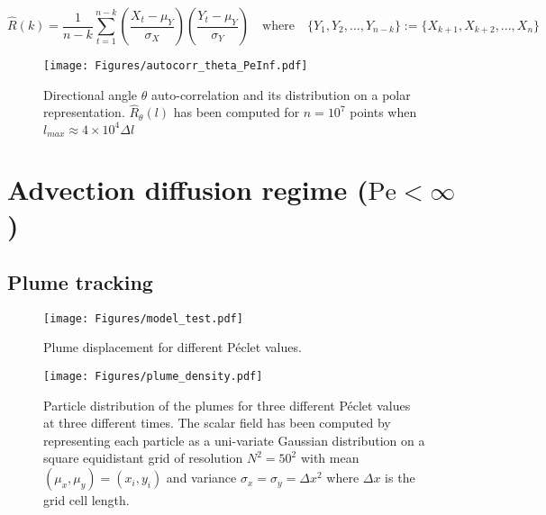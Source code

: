 \begin{equation}
\hat R(k) = \frac{1}{n-k} \sum_{t=1}^{n-k} \left(\frac{X_t-\mu_Y}{\sigma_X}\right)\left(\frac{Y_t-\mu_Y}{\sigma_Y}\right) \quad\textrm{where}\quad \{Y_1,Y_2,...,Y_{n-k}\} := \{X_{k+1},X_{k+2},...,X_{n}\} 
\label{eq:autocorr}
\end{equation}

\begin{figure}
	\centering
	\texttt{[image: Figures/autocorr\_theta\_PeInf.pdf]}
	\caption{Directional angle $\theta$ auto-correlation and its distribution on a polar representation. $\hat{R}_\theta(l)$ has been computed for $n=10^7$ points when $l_{max}\approx 4\times10^4 \Delta l$}
	\label{fig:autocorrt_peinf}
\end{figure}

\chapter{Advection diffusion regime ($\mathrm{Pe}<\infty$)}

\section{Plume tracking}
\begin{figure}[h!]
	\centering
	\texttt{[image: Figures/model\_test.pdf]}
	\caption{Plume displacement for different Péclet values.}
	\label{fig:lvm_pdf_peinf}
\end{figure}

\begin{figure}[h!]
	\centering
	\texttt{[image: Figures/plume\_density.pdf]}
	\caption{Particle distribution of the plumes for three different Péclet values at three different times. The scalar field has been computed by representing each particle as a uni-variate Gaussian distribution on a square equidistant grid of resolution $N^2=50^2$ with mean $(\mu_x,\mu_y)=(x_i,y_i)$ and variance $\sigma_x = \sigma_y = \Delta x^2$ where $\Delta x$ is the grid cell length.}
	\label{fig:plume_density}
\end{figure}



